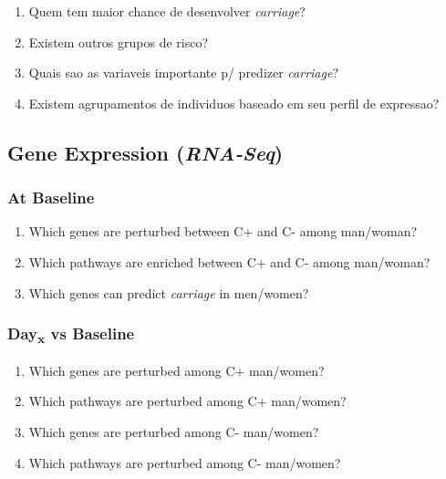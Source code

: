 \documentclass[
]{book}
\providecommand{\tightlist}{%
  \setlength{\itemsep}{0pt}\setlength{\parskip}{0pt}}
\begin{document}
\begin{enumerate}
\def\labelenumi{\arabic{enumi}.}
\tightlist
\item
  Quem tem maior chance de desenvolver \emph{carriage}?
\item
  Existem outros grupos de risco?
\item
  Quais sao as variaveis importante p/ predizer \emph{carriage}?
\item
  Existem agrupamentos de individuos baseado em seu perfil de expressao?
\end{enumerate}

\hypertarget{gene-expression-rna-seq}{%
\subsection{\texorpdfstring{Gene Expression (\emph{RNA-Seq})}{Gene Expression (RNA-Seq)}}\label{gene-expression-rna-seq}}

\hypertarget{at-baseline}{%
\subsubsection{At Baseline}\label{at-baseline}}

\begin{enumerate}
\def\labelenumi{\arabic{enumi}.}
\tightlist
\item
  Which genes are perturbed between C+ and C- among man/woman?
\item
  Which pathways are enriched between C+ and C- among man/woman?
\item
  Which genes can predict \emph{carriage} in men/women?
\end{enumerate}

\hypertarget{dayx-vs-baseline}{%
\subsubsection{\texorpdfstring{Day\textsubscript{x} vs Baseline}{Dayx vs Baseline}}\label{dayx-vs-baseline}}

\begin{enumerate}
\def\labelenumi{\arabic{enumi}.}
\tightlist
\item
  Which genes are perturbed among C+ man/women?
\item
  Which pathways are perturbed among C+ man/women?
\item
  Which genes are perturbed among C- man/women?
\item
  Which pathways are perturbed among C- man/women?
\end{enumerate}
\end{document}
